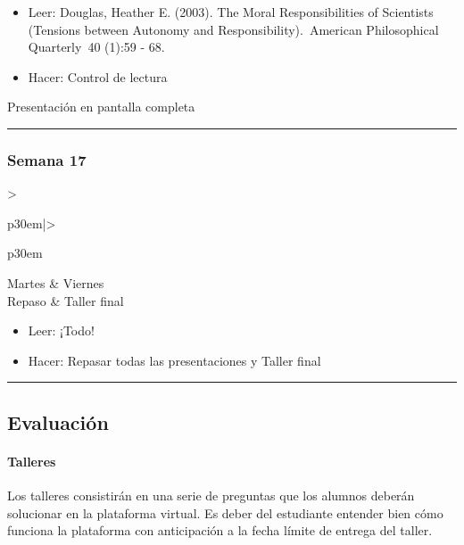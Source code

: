 \documentclass[spanish,]{article}
\let\oldparagraph\paragraph
\renewcommand{\paragraph}[1]{\oldparagraph{#1}\mbox{}}
\begin{document}
\begin{itemize}
\item
  Leer: Douglas, Heather E. (2003). The Moral Responsibilities of
  Scientists (Tensions between Autonomy and Responsibility).~American
  Philosophical Quarterly~40 (1):59 - 68.
\item
  Hacer: Control de lectura
\end{itemize}

Presentación en pantalla completa

\begin{center}\rule{0.5\linewidth}{\linethickness}\end{center}

\subsubsection{Semana 17}\label{semana-17}

\begin{tabular}{>{\raggedright\arraybackslash}p{30em}|>{\raggedright\arraybackslash}p{30em}}
\hline
Martes & Viernes\\
\hline
Repaso & Taller final\\
\hline
\end{tabular}

\begin{itemize}
\item
  Leer: ¡Todo!
\item
  Hacer: Repasar todas las presentaciones y Taller final
\end{itemize}

\begin{center}\rule{0.5\linewidth}{\linethickness}\end{center}

\subsection{Evaluación}\label{evaluaciuxf3n}

\paragraph{\texorpdfstring{\textbf{Talleres}}{Talleres}}\label{talleres}

Los talleres consistirán en una serie de preguntas que los alumnos
deberán solucionar en la plataforma virtual. Es deber del estudiante
entender bien cómo funciona la plataforma con anticipación a la fecha
límite de entrega del taller.
\end{document}
